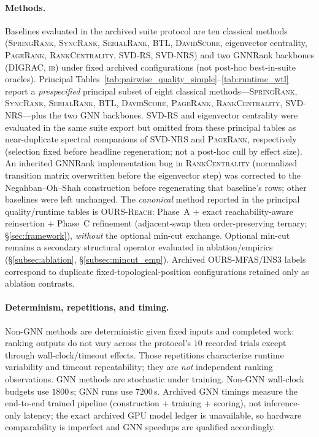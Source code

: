 \documentclass{article}
\begin{document}
\paragraph{Methods.}
Baselines evaluated in the archived suite protocol are ten classical methods (\textsc{SpringRank}, \textsc{SyncRank}, \textsc{SerialRank}, \textsc{BTL}, \textsc{DavidScore}, eigenvector centrality, \textsc{PageRank}, \textsc{RankCentrality}, \textsc{SVD-RS}, \textsc{SVD-NRS}) and two GNNRank backbones (\textsc{DIGRAC}, \textsc{ib}) under fixed archived configurations (not post-hoc best-in-suite oracles).
Principal Tables~\ref{tab:pairwise_quality_simple}--\ref{tab:runtime_wtl} report a \emph{prespecified} principal subset of eight classical methods---\textsc{SpringRank}, \textsc{SyncRank}, \textsc{SerialRank}, \textsc{BTL}, \textsc{DavidScore}, \textsc{PageRank}, \textsc{RankCentrality}, \textsc{SVD-NRS}---plus the two GNN backbones.
\textsc{SVD-RS} and eigenvector centrality were evaluated in the same suite export but omitted from these principal tables as near-duplicate spectral companions of \textsc{SVD-NRS} and \textsc{PageRank}, respectively (selection fixed before headline regeneration; not a post-hoc cull by effect size).
An inherited GNNRank implementation bug in \textsc{RankCentrality} (normalized transition matrix overwritten before the eigenvector step) was corrected to the Negahban--Oh--Shah construction before regenerating that baseline's rows; other baselines were left unchanged.
The \emph{canonical} method reported in the principal quality/runtime tables is \textsc{OURS-Reach}: Phase~A + exact reachability-aware reinsertion + Phase~C refinement (adjacent-swap then order-preserving ternary; \S\ref{sec:framework}), \emph{without} the optional min-cut exchange.
Optional min-cut remains a secondary structural operator evaluated in ablation/empirics (\S\ref{subsec:ablation}, \S\ref{subsec:mincut_emp}).
Archived \textsc{OURS-MFAS}/\textsc{INS3} labels correspond to duplicate fixed-topological-position configurations retained only as ablation contrasts.

\paragraph{Determinism, repetitions, and timing.}
Non-GNN methods are deterministic given fixed inputs and completed work: ranking outputs do not vary across the protocol's $10$ recorded trials except through wall-clock/timeout effects.
Those repetitions characterize runtime variability and timeout repeatability; they are \emph{not} independent ranking observations.
GNN methods are stochastic under training.
Non-GNN wall-clock budgets use $1800$\,s; GNN runs use $7200$\,s.
Archived GNN timings measure the end-to-end trained pipeline (construction + training + scoring), not inference-only latency; the exact archived GPU model ledger is unavailable, so hardware comparability is imperfect and GNN speedups are qualified accordingly.
\end{document}
